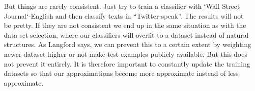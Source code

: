 \documentclass{article}
\theoremstyle{plain}
\theoremstyle{nonumberplain}
\begin{document}
But things are rarely consistent.
Just try to train a classifier with `Wall Street Journal`-English and then classify texts in ``Twitter-speak''.
The results will not be pretty. 
If they are not consistent we end up in the same situation as with the data set selection, where our classifiers will overfit to a dataset instead of natural structures.
As Langford says, we can prevent this to a certain extent by weighting newer dataset higher or not make test examples publicly available. 
But this does not prevent it entirely. 
It is therefore important to constantly update the training datasets so that our approximations become more approximate instead of less approximate. 



\end{document}
